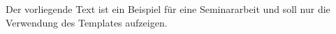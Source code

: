 %
\vspace*{0.4cm}

\noindent Der vorliegende Text ist ein Beispiel für eine Seminararbeit und soll nur die Verwendung des Templates aufzeigen.
